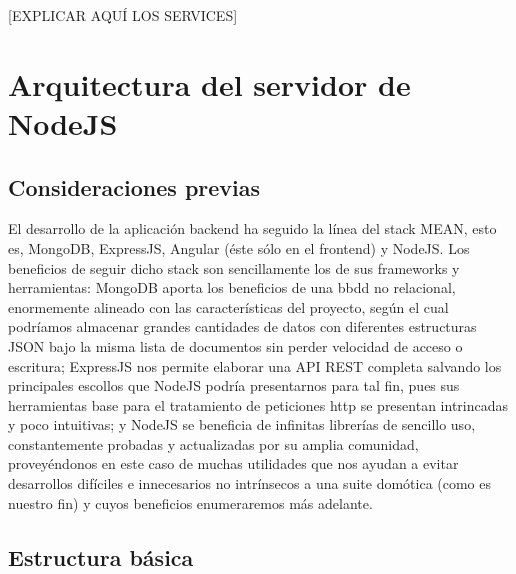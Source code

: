 [EXPLICAR AQUÍ LOS SERVICES]

\section{Arquitectura del servidor de NodeJS}
\label{makereference4.6}

\subsection{Consideraciones previas}
\label{makereference4.6.1}

El desarrollo de la aplicación backend ha seguido la línea del stack MEAN, esto es, MongoDB, ExpressJS, Angular (éste sólo en el frontend) y NodeJS. Los beneficios de seguir dicho stack son sencillamente los de sus frameworks y herramientas: MongoDB aporta los beneficios de una \gls{bbdd} no relacional, enormemente alineado con las características del proyecto, según el cual podríamos almacenar grandes cantidades de datos con diferentes estructuras JSON bajo la misma lista de documentos sin perder velocidad de acceso o escritura; ExpressJS nos permite elaborar una API REST completa salvando los principales escollos que NodeJS podría presentarnos para tal fin, pues sus herramientas base para el tratamiento de peticiones http se presentan intrincadas y poco intuitivas; y NodeJS se beneficia de infinitas librerías de sencillo uso, constantemente probadas y actualizadas por su amplia comunidad, proveyéndonos en este caso de muchas utilidades que nos ayudan a evitar desarrollos difíciles e innecesarios no intrínsecos a una suite domótica (como es nuestro fin) y cuyos beneficios enumeraremos más adelante.

\subsection{Estructura básica}
\label{makereference4.6.2}

